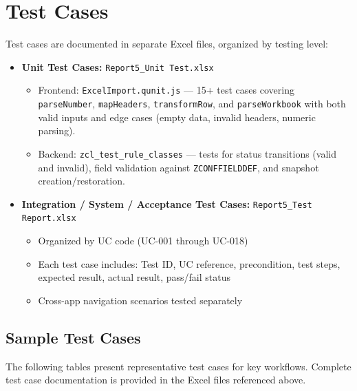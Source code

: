 \documentclass[12pt,a4paper]{report}
\begin{document}
\section{Test Cases}

Test cases are documented in separate Excel files, organized by testing level:

\begin{itemize}[leftmargin=2em]
  \item \textbf{Unit Test Cases:} \texttt{Report5\_Unit Test.xlsx}
    \begin{itemize}
      \item Frontend: \texttt{ExcelImport.qunit.js} --- 15+ test cases covering \texttt{parseNumber}, \texttt{mapHeaders}, \texttt{transformRow}, and \texttt{parseWorkbook} with both valid inputs and edge cases (empty data, invalid headers, numeric parsing).
      \item Backend: \texttt{zcl\_test\_rule\_classes} --- tests for status transitions (valid and invalid), field validation against \texttt{ZCONFFIELDDEF}, and snapshot creation/restoration.
    \end{itemize}

  \item \textbf{Integration / System / Acceptance Test Cases:} \texttt{Report5\_Test Report.xlsx}
    \begin{itemize}
      \item Organized by UC code (UC-001 through UC-018)
      \item Each test case includes: Test ID, UC reference, precondition, test steps, expected result, actual result, pass/fail status
      \item Cross-app navigation scenarios tested separately
    \end{itemize}
\end{itemize}


\subsection{Sample Test Cases}

The following tables present representative test cases for key workflows. Complete test case documentation is provided in the Excel files referenced above.
\end{document}
